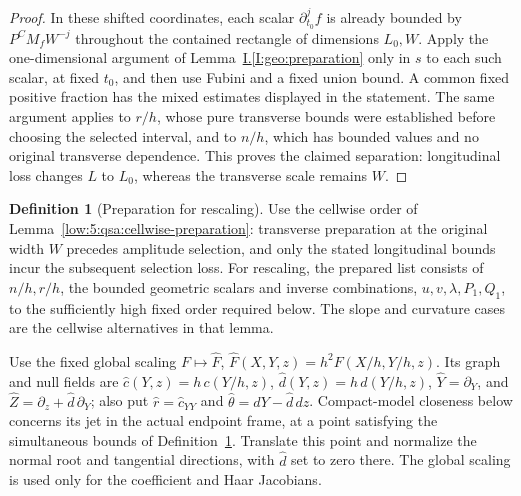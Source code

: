 \documentclass[11pt]{amsart}
\theoremstyle{definition}
\newtheorem{definition}{Definition}[section]
\theoremstyle{remark}
\numberwithin{equation}{section}
\newcommand{\partIref}[1]{\hyperref[I:#1]{I.\ref*{I:#1}}}
\begin{document}
\begin{proof}
In these shifted coordinates, each scalar $\partial_{t_0}^jf$ is already bounded by $P^CM_fW^{-j}$ throughout the contained rectangle of dimensions $L_0,W$. Apply the one-dimensional argument of Lemma~\partIref{geo:preparation} only in $s$ to each such scalar, at fixed $t_0$, and then use Fubini and a fixed union bound. A common fixed positive fraction has the mixed estimates displayed in the statement. The same argument applies to $r/h$, whose pure transverse bounds were established before choosing the selected interval, and to $n/h$, which has bounded values and no original transverse dependence. This proves the claimed separation: longitudinal loss changes $L$ to $L_0$, whereas the transverse scale remains $W$. 
\end{proof}

\begin{definition}[Preparation for rescaling]\label{def:prepared-rescaling}
Use the cellwise order of Lemma~\ref{low:5:qsa:cellwise-preparation}: transverse preparation at the original width $W$ precedes amplitude selection, and only the stated longitudinal bounds incur the subsequent selection loss. For rescaling, the prepared list consists of $n/h,r/h$, the bounded geometric scalars and inverse combinations, $u,v,\lambda,P_1,Q_1$, to the sufficiently high fixed order required below. The slope and curvature cases are the cellwise alternatives in that lemma.
\end{definition}
Use the fixed global scaling $F\mapsto\widehat F$, $\widehat F(X,Y,z)=h^2F(X/h,Y/h,z)$. Its graph and null fields are $\widehat c(Y,z)=h\,c(Y/h,z)$, $\widehat d(Y,z)=h\,d(Y/h,z)$, $\widehat Y=\partial_Y$, and $\widehat Z=\partial_z+\widehat d\,\partial_Y$; also put $\widehat r=\widehat c_{YY}$ and $\widehat\theta=dY-\widehat d\,dz$. Compact-model closeness below concerns its jet in the actual endpoint frame, at a point satisfying the simultaneous bounds of Definition~\ref{def:prepared-rescaling}. Translate this point and normalize the normal root and tangential directions, with $\widehat d$ set to zero there. The global scaling is used only for the coefficient and Haar Jacobians.
\end{document}
